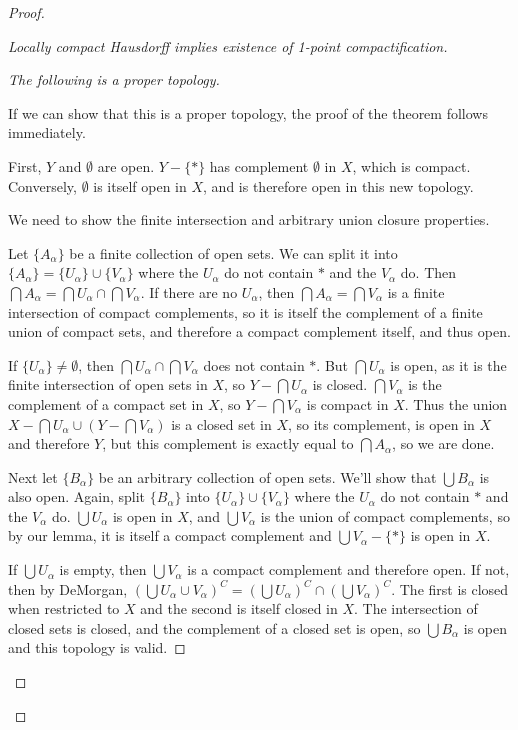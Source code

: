 \begin{proof}
\begin{proof}[Locally compact Hausdorff implies existence of 1-point compactification]
\begin{proof}[The following is a proper topology]
\begin{enumerate}
			
			
		\end{enumerate}
		
		If we can show that this is a proper topology, the proof of the theorem follows immediately.
		
		First, $Y$ and $\emptyset$ are open.  $Y{-}\{\ast\}$ has complement $\emptyset$ in $X$, which is compact.  Conversely, $\emptyset$ is itself open in $X$, and is therefore open in this new topology.
		
		We need to show the  finite intersection and arbitrary union closure properties.
		
		Let $\{A_\alpha\}$ be a finite collection of open sets.  We can split it into $\{A_\alpha\} = \{U_\alpha\}\cup \{V_\alpha\}$ where the $U_\alpha$ do not contain $\ast$ and the $V_\alpha$ do.  Then $\bigcap A_\alpha = \bigcap U_\alpha \cap \bigcap V_\alpha$.  If there are no $U_\alpha$, then $\bigcap A_\alpha = \bigcap V_\alpha$ is a finite intersection of compact complements, so it is itself the complement of a finite union of compact sets, and therefore a compact complement itself, and thus open.
		
		If $\{U_\alpha\}\neq \emptyset$, then $\bigcap U_\alpha \cap \bigcap V_\alpha$ does not contain $\ast$.  But $\bigcap U_\alpha$ is open, as it is the finite intersection of open sets in $X$, so $Y{-}\bigcap U_\alpha$ is closed.  $\bigcap V_\alpha$ is the complement of a compact set in $X$, so $Y{-}\bigcap V_\alpha$ is compact in $X$.  Thus the union $X{-}\bigcap U_\alpha \cup (Y{-}\bigcap V_\alpha)$ is a closed set in $X$, so its complement, is open in $X$ and therefore $Y$, but this complement is exactly equal to $\bigcap A_\alpha$, so we are done.
		
		Next let $\{B_\alpha\}$ be an arbitrary collection of open sets.  We'll show that $\bigcup B_\alpha$ is also open.  Again, split $\{B_\alpha\}$ into $\{U_\alpha\}\cup \{V_\alpha\}$ where the $U_\alpha$ do not contain $\ast$ and the $V_\alpha$ do.  $\bigcup U_\alpha$ is open in $X$, and $\bigcup V_\alpha$ is the union of compact complements, so by our lemma, it is itself a compact complement and $\bigcup V_\alpha {-}\{\ast\}$ is open in $X$.
		
		If $\bigcup U_\alpha$ is empty, then $\bigcup V_\alpha$ is a compact complement and therefore open.  If not, then by DeMorgan, $(\bigcup U_\alpha \cup V_\alpha)^C=(\bigcup U_\alpha)^C\cap(\bigcup V_\alpha)^C$.  The first is closed when restricted to $X$ and the second is itself closed in $X$.  The intersection of closed sets is closed, and the complement of a closed set is open, so $\bigcup B_\alpha$ is open and this topology is valid.
		

\end{proof}
\end{proof}
\end{proof}
